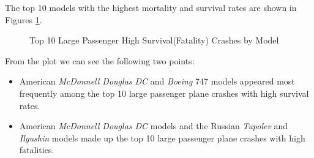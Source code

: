 \documentclass[12pt]{article}
\begin{document}
The top 10 models with the highest mortality and survival rates are shown in Figures \ref{fig:Type10}.

\begin{figure}[htp]
    \centering
    \caption{Top 10 Large Passenger High Survival(Fatality) Crashes by Model}
    \label{fig:Type10}
\end{figure}
From the plot we can see the following two points: 
\begin{itemize}
    \item American \emph{McDonnell Douglas DC} and \emph{Boeing} 747 models appeared most frequently among the top 10 large passenger plane crashes with high survival rates. 
    \item American \emph{McDonnell Douglas DC} models and the Russian \emph{Tupolev} and \emph{Ilyushin} models made up the top 10 large passenger plane crashes with high fatalities. 
\end{itemize}
\end{document}
